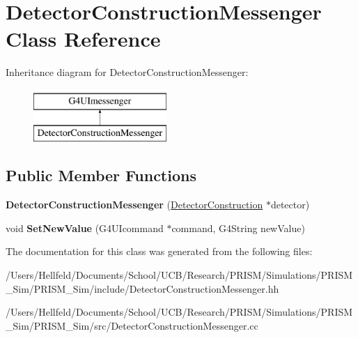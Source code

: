 \hypertarget{class_detector_construction_messenger}{}\section{Detector\+Construction\+Messenger Class Reference}
\label{class_detector_construction_messenger}
Inheritance diagram for Detector\+Construction\+Messenger\+:\begin{figure}[H]
\begin{center}
\leavevmode
\includegraphics[height=2.000000cm]{class_detector_construction_messenger}
\end{center}
\end{figure}
\subsection*{Public Member Functions}
\begin{DoxyCompactItemize}
\item 
\hypertarget{class_detector_construction_messenger_ac67c5bc42cefea15e67863b59688b4fd}{}\label{class_detector_construction_messenger_ac67c5bc42cefea15e67863b59688b4fd} 
{\bfseries Detector\+Construction\+Messenger} (\hyperlink{class_detector_construction}{Detector\+Construction} $\ast$detector)
\item 
\hypertarget{class_detector_construction_messenger_aeff6b7186961b0212b82621412d95058}{}\label{class_detector_construction_messenger_aeff6b7186961b0212b82621412d95058} 
void {\bfseries Set\+New\+Value} (G4\+U\+Icommand $\ast$command, G4\+String new\+Value)
\end{DoxyCompactItemize}


The documentation for this class was generated from the following files\+:\begin{DoxyCompactItemize}
\item 
/\+Users/\+Hellfeld/\+Documents/\+School/\+U\+C\+B/\+Research/\+P\+R\+I\+S\+M/\+Simulations/\+P\+R\+I\+S\+M\+\_\+\+Sim/\+P\+R\+I\+S\+M\+\_\+\+Sim/include/Detector\+Construction\+Messenger.\+hh\item 
/\+Users/\+Hellfeld/\+Documents/\+School/\+U\+C\+B/\+Research/\+P\+R\+I\+S\+M/\+Simulations/\+P\+R\+I\+S\+M\+\_\+\+Sim/\+P\+R\+I\+S\+M\+\_\+\+Sim/src/Detector\+Construction\+Messenger.\+cc\end{DoxyCompactItemize}
